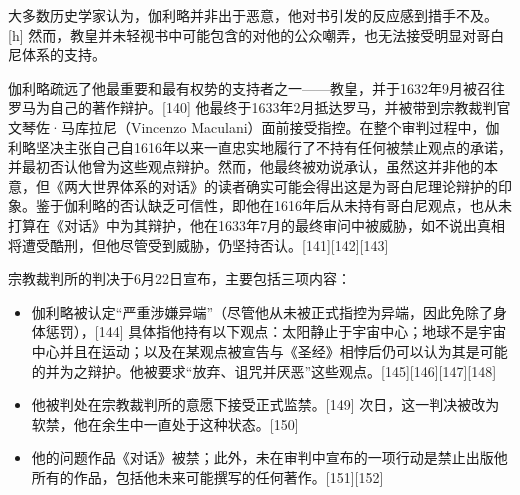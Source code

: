 大多数历史学家认为，伽利略并非出于恶意，他对书引发的反应感到措手不及。[h] 然而，教皇并未轻视书中可能包含的对他的公众嘲弄，也无法接受明显对哥白尼体系的支持。

伽利略疏远了他最重要和最有权势的支持者之一——教皇，并于1632年9月被召往罗马为自己的著作辩护。[140] 他最终于1633年2月抵达罗马，并被带到宗教裁判官文琴佐·马库拉尼（Vincenzo Maculani）面前接受指控。在整个审判过程中，伽利略坚决主张自己自1616年以来一直忠实地履行了不持有任何被禁止观点的承诺，并最初否认他曾为这些观点辩护。然而，他最终被劝说承认，虽然这并非他的本意，但《两大世界体系的对话》的读者确实可能会得出这是为哥白尼理论辩护的印象。鉴于伽利略的否认缺乏可信性，即他在1616年后从未持有哥白尼观点，也从未打算在《对话》中为其辩护，他在1633年7月的最终审问中被威胁，如不说出真相将遭受酷刑，但他尽管受到威胁，仍坚持否认。[141][142][143]  

宗教裁判所的判决于6月22日宣布，主要包括三项内容：  
\begin{itemize}
\item 伽利略被认定“严重涉嫌异端”（尽管他从未被正式指控为异端，因此免除了身体惩罚），[144] 具体指他持有以下观点：太阳静止于宇宙中心；地球不是宇宙中心并且在运动；以及在某观点被宣告与《圣经》相悖后仍可以认为其是可能的并为之辩护。他被要求“放弃、诅咒并厌恶”这些观点。[145][146][147][148]  
\item 他被判处在宗教裁判所的意愿下接受正式监禁。[149] 次日，这一判决被改为软禁，他在余生中一直处于这种状态。[150]  
\item 他的问题作品《对话》被禁；此外，未在审判中宣布的一项行动是禁止出版他所有的作品，包括他未来可能撰写的任何著作。[151][152]
\end{itemize}